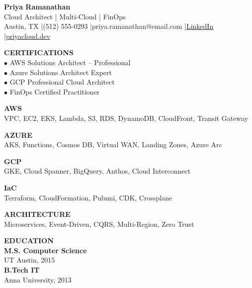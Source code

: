 \documentclass[9.5pt,a4paper]{article}
\begin{document}
\noindent\colorbox{darkbg}{\parbox{\textwidth}{\vspace{6pt}\centering
{\color{white}\fontsize{18}{22}\selectfont\bfseries Priya Ramanathan}\\[3pt]
{\color{accent}\small Cloud Architect | Multi-Cloud | FinOps}\\[3pt]
{\color{white}\small Austin, TX \quad|\quad (512) 555-0293 \quad|\quad priya.ramanathan@email.com \quad|\quad \href{https://linkedin.com/in/priyaramanathan}{\color{accent}LinkedIn} \quad|\quad \href{https://priyacloud.dev}{\color{accent}priyacloud.dev}}
\vspace{6pt}}}

\vspace{6pt}

\noindent\begin{minipage}[t]{0.3\textwidth}
\begin{tcolorbox}[colback=lightbg,colframe=accent,boxrule=0.5pt,arc=2pt,left=3pt,right=3pt,top=3pt,bottom=3pt]
{\small\bfseries\color{darkbg}CERTIFICATIONS}\\[3pt]
{\footnotesize
$\bullet$ AWS Solutions Architect -- Professional\\[2pt]
$\bullet$ Azure Solutions Architect Expert\\[2pt]
$\bullet$ GCP Professional Cloud Architect\\[2pt]
$\bullet$ FinOps Certified Practitioner}
\end{tcolorbox}

\vspace{4pt}
{\small\bfseries\color{darkbg}AWS}\\[2pt]
{\footnotesize VPC, EC2, EKS, Lambda, S3, RDS, DynamoDB, CloudFront, Transit Gateway}

\vspace{4pt}
{\small\bfseries\color{darkbg}AZURE}\\[2pt]
{\footnotesize AKS, Functions, Cosmos DB, Virtual WAN, Landing Zones, Azure Arc}

\vspace{4pt}
{\small\bfseries\color{darkbg}GCP}\\[2pt]
{\footnotesize GKE, Cloud Spanner, BigQuery, Anthos, Cloud Interconnect}

\vspace{4pt}
{\small\bfseries\color{darkbg}IaC}\\[2pt]
{\footnotesize Terraform, CloudFormation, Pulumi, CDK, Crossplane}

\vspace{4pt}
{\small\bfseries\color{darkbg}ARCHITECTURE}\\[2pt]
{\footnotesize Microservices, Event-Driven, CQRS, Multi-Region, Zero Trust}

\vspace{4pt}
{\small\bfseries\color{darkbg}EDUCATION}\\[2pt]
{\footnotesize\textbf{M.S. Computer Science}\\UT Austin, 2015\\[2pt]
\textbf{B.Tech IT}\\Anna University, 2013}
\end{minipage}%
\end{document}
